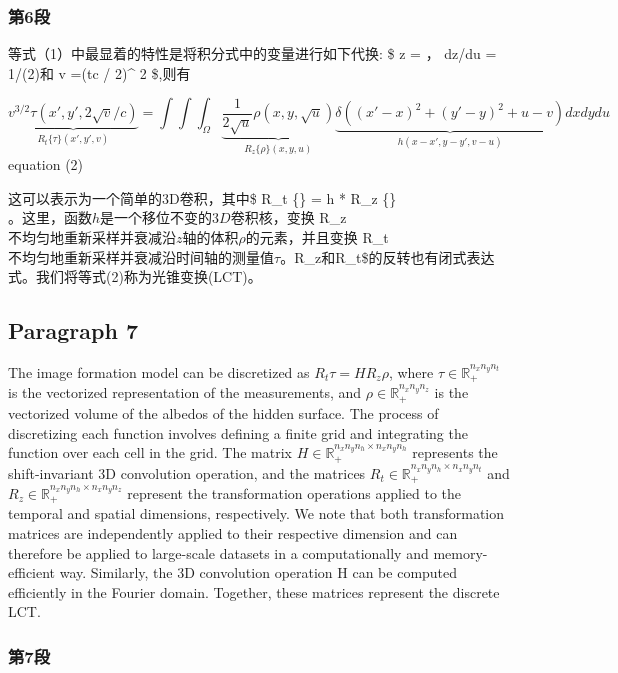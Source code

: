 \documentclass[11pt]{article}
\begin{document}
    \subsubsection{第6段}\label{ux7b2c6ux6bb5}

等式（1）中最显着的特性是将积分式中的变量进行如下代换: \$ z = 
\(，\) dz/du = 1/(2)\(和\) v =(tc / 2)\^{} 2 \$,则有

\[\underbrace{v^{3/2}\tau (x',y',2\sqrt{v} /c)}_{R_{t}\{\tau \}(x',y',v)}=\int\int\int_{\Omega}\underbrace{\frac{1}{2\sqrt{u}}\rho (x,y,\sqrt{u})}_{R_{z}\{\rho \}(x,y,u)}\underbrace{\delta((x'-x)^2+(y'-y)^2+u-v)}_{h(x-x',y-y',v-u)}dxdydu\]
equation (2)

这可以表示为一个简单的3D卷积，其中\$ R\_t \{\tau \} = h * R\_z
\{\rho \}\(。 这里，函数h是一个移位不变的3D卷积核，变换\) R\_z
\(不均匀地重新采样并衰减沿z轴的体积ρ的元素，并且变换\) R\_t
\(不均匀地重新采样并衰减沿时间轴的测量值τ。\)R\_z\(和\)R\_t\$的反转也有闭式表达式。我们将等式(2)称为光锥变换(LCT)。

    \subsection{Paragraph 7}\label{paragraph-7}

The image formation model can be discretized as \(R_t\tau =HR_z\rho\),
where \(\tau \in \mathbb{R}_+^{n_{x}n_{y}n_{t}}\) is the vectorized
representation of the measurements, and
\(\rho \in \mathbb{R}_+^{n_{x}n_{y}n_{z}}\) is the vectorized volume of
the albedos of the hidden surface. The process of discretizing each
function involves defining a finite grid and integrating the function
over each cell in the grid. The matrix
\(H \in \mathbb{R}_+^{n_{x}n_{y}n_{h}\times n_{x}n_{y}n_{h}}\)
represents the shift-invariant 3D convolution operation, and the
matrices
\(R_{t} \in \mathbb{R}_+^{n_{x}n_{y}n_{h}\times n_{x}n_{y}n_{t}}\) and
\(R_z \in \mathbb{R}_+^{n_{x}n_{y}n_{h}\times n_{x}n_{y}n_{z}}\)
represent the transformation operations applied to the temporal and
spatial dimensions, respectively. We note that both transformation
matrices are independently applied to their respective dimension and can
therefore be applied to large-scale datasets in a computationally and
memory-efficient way. Similarly, the 3D convolution operation H can be
computed efficiently in the Fourier domain. Together, these matrices
represent the discrete LCT.

    \subsubsection{第7段}\label{ux7b2c7ux6bb5}
\end{document}
